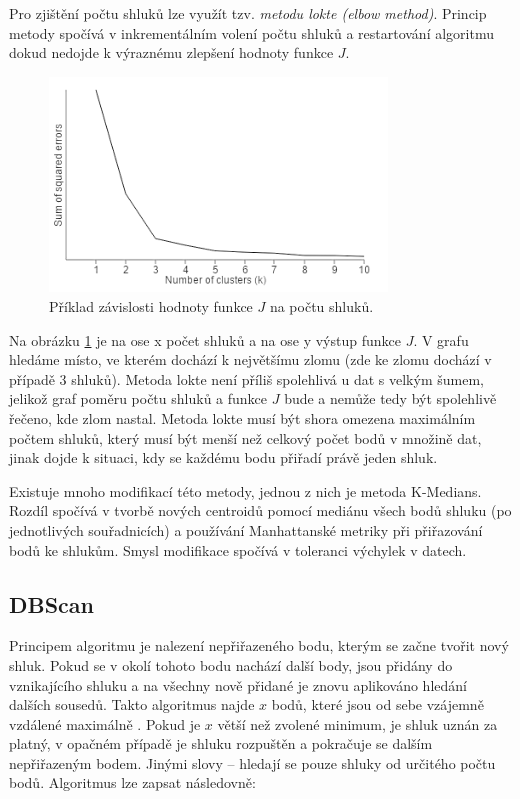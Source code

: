 \documentclass[pdftex,a4paper]{article}
\newcommand*{\parvsp}{\par\vspace{\baselineskip}\noindent}
\begin{document}
Pro zjištění počtu shluků lze využít tzv. \textit{metodu lokte (elbow method)}. Princip metody spočívá v inkrementálním volení počtu shluků a restartování algoritmu dokud nedojde k výraznému zlepšení hodnoty funkce $J$.

\begin{figure}[h]
	\centering
	\includegraphics[width=0.8\textwidth]{res/elbow.png}
	\caption{Příklad závislosti hodnoty funkce $J$ na počtu shluků.}
	\label{fig:obr1}
\end{figure}

Na obrázku \ref{fig:obr1} je na ose x počet shluků a na ose y výstup funkce $J$. V grafu hledáme místo, ve kterém dochází k největšímu zlomu (zde ke zlomu dochází v případě 3 shluků). Metoda lokte není příliš spolehlivá u dat s velkým šumem, jelikož graf poměru počtu shluků a funkce $J$ bude  a nemůže tedy být spolehlivě řečeno, kde zlom nastal. Metoda lokte musí být shora omezena maximálním počtem shluků, který musí být menší než celkový počet bodů v množině dat, jinak dojde k situaci, kdy se každému bodu přiřadí právě jeden shluk.

\parvsp
Existuje mnoho modifikací této metody, jednou z nich je metoda K-Medians. Rozdíl spočívá v tvorbě nových centroidů pomocí mediánu všech bodů shluku (po jednotlivých souřadnicích) a používání Manhattanské metriky při přiřazování bodů ke shlukům. Smysl modifikace spočívá v toleranci výchylek v datech.



\subsection{DBScan}
Principem algoritmu je nalezení nepřiřazeného bodu, kterým se začne tvořit nový shluk. Pokud se v \textepsilon{} okolí tohoto bodu nachází další body, jsou přidány do vznikajícího shluku a na všechny nově přidané je znovu aplikováno hledání dalších sousedů. Takto algoritmus najde $x$ bodů, které jsou od sebe vzájemně vzdálené maximálně \textepsilon. Pokud je $x$ větší než zvolené minimum, je shluk uznán za platný, v opačném případě je shluku rozpuštěn a pokračuje se dalším nepřiřazeným bodem. Jinými slovy -- hledají se pouze shluky od určitého počtu bodů. Algoritmus lze zapsat následovně:
\end{document}
